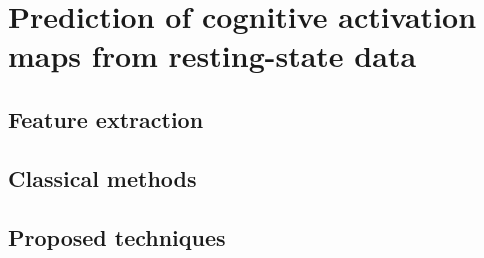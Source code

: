 \chapter{Prediction of cognitive activation maps from resting-state data}\label{chapter1_activation_maps}

\section{Feature extraction}
\section{Classical methods}
\section{Proposed techniques}









